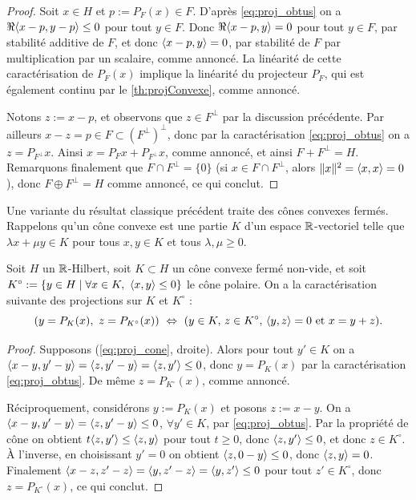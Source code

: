 \begin{proof}
	Soit $x \in H$ et $p := P_F(x) \in F$. D'après \eqref{eq:proj_obtus} on a $\Re\langle x-p,y-p\rangle \leq 0$ pour tout $y \in F$. Donc $\Re\langle x-p,y\rangle = 0$ pour tout $y \in F$, par stabilité additive de $F$, et donc $\langle x-p,y\rangle = 0$, par stabilité de $F$ par multiplication par un scalaire, comme annoncé. La linéarité de cette caractérisation de $P_F(x)$ implique la linéarité du projecteur $P_F$, qui est également continu par le \cref{th:projConvexe}, comme annoncé.
	
	Notons $z := x-p$, et observons que $z \in F^\perp$ par la discussion précédente. Par ailleurs $x-z = p \in F \subset (F^\perp)^\perp$, donc par la caractérisation \eqref{eq:proj_obtus} on a $z = P_{F^\perp} x$. Ainsi $x = P_F x + P_{F^\perp} x$, comme annoncé, et ainsi $F + F^\perp = H$. Remarquons finalement que $F \cap F^\perp = \{0\}$ (si $x \in F \cap F^\perp$, alors $\|x\|^2 = \langle x,x\rangle = 0$), donc $F \oplus F^\perp = H$ comme annoncé, ce qui conclut.
\end{proof}

Une variante du résultat classique précédent traite des cônes convexes fermés. Rappelons qu'un cône convexe est une partie $K$ d'un espace $\mathbb{R}$-vectoriel telle que $\lambda x+\mu y \in K$ pour tous $x,y \in K$ et tous $\lambda,\mu \geq 0$. 

\begin{proposition}
\label{prop:decompCone}
%
	Soit $H$ un $\mathbb{R}$-Hilbert, soit $K \subset H$ un cône convexe fermé non-vide, et soit $K^\circ := \{y\in H\mid \forall x \in K,\ \<x,y\> \leq 0\}$ le cône polaire. %
	On a la caractérisation suivante des projections sur $K$ et $K^\circ$ : %
	\begin{equation}
	\label{eq:proj_cone}
		(y = P_K(x),\ z=P_{K^\circ} (x)) \ \Leftrightarrow \ (y\in K,\, z \in K^\circ,\, \langle y,z\rangle=0 \text{ et } x = y + z). 
	\end{equation}
\end{proposition}

\begin{proof}
	Supposons (\ref{eq:proj_cone}, droite). Alors pour tout $y' \in K$ on a $\langle x-y,y'-y\rangle = \langle z,y'-y\rangle = \langle z,y'\rangle \leq 0$, donc $y = P_K(x)$ par la caractérisation \eqref{eq:proj_obtus}. De même $z = P_{K^\circ} (x)$, comme annoncé.
	
	Réciproquement, considérons $y:=P_K(x)$ et posons $z := x-y$. On a $\langle x-y,y'-y\rangle =\langle z,y'-y\rangle \leq 0$, $\forall y' \in K$, par \eqref{eq:proj_obtus}. Par la propriété de cône on obtient $t \langle z,y'\rangle \leq \langle z,y\rangle$ pour tout $t \geq 0$, donc $\langle z,y'\rangle \leq 0$, et donc $z \in K^\circ$. 
	À l'inverse, en choisissant $y'=0$ on obtient $\langle z,0-y\rangle\leq 0$, donc $\langle z,y\rangle=0$. Finalement $\langle x-z,z'-z\rangle = \langle y,z'-z\rangle = \langle y,z'\rangle \leq 0$ pour tout $z' \in K^\circ$, donc $z = P_{K^\circ}(x)$, ce qui conclut.  
\end{proof}

